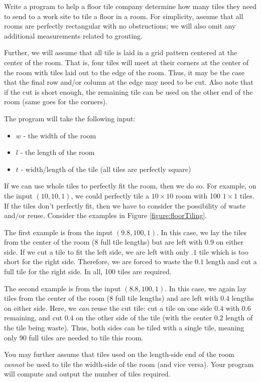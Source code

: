 \begin{exer}
Write a program to  help a floor tile company determine how many
tiles they need to send to a work site to tile a floor in a room.  For 
simplicity, assume that all rooms are perfectly rectangular with no 
obstructions; we will also omit any additional measurements related 
to grouting.  

Further, we will assume that all tile is laid in a grid pattern centered 
at the center of the room.  That is, four tiles will meet at their corners 
at the center of the room with tiles laid out to the edge of the room.  
Thus, it may be the case that the final row and/or column at the edge 
may need to be cut.  Also note that if the cut is short enough, the 
remaining tile can be used on the other end of the room (same goes 
for the corners).

The program will take the following input:
\begin{itemize}
  \item $w$ - the width of the room
  \item $l$ - the length of the room
  \item $t$ - width/length of the tile (all tiles are perfectly square)
\end{itemize}

If we can use whole tiles to perfectly fit the room, then we do so.  
For example, on the input $(10, 10, 1)$, we could perfectly tile a 
$10 \times 10$ room with 100 $1 \times 1$ tiles.  If the tiles don't 
perfectly fit, then we have to consider the possibility of waste 
and/or reuse.  Consider the examples in Figure \ref{figure:floorTiling}.



The first example is from the input $(9.8, 100, 1)$.  In this case, 
we lay the tiles from the center of the room (8 full tile lengths) but 
are left with $0.9$ on either side.  If we cut a tile to fit the left
side, we are left with only $.1$ tile which is too short for the right 
side.  Therefore, we are forced to waste the $0.1$ length and cut 
a full tile for the right side.  In all, 100 tiles are required.

The second example is from the input $(8.8, 100, 1)$.  In this case, 
we again lay tiles from the center of the room (8 full tile lengths) and 
are left with $0.4$ lengths on either side.  Here, we \emph{can}
reuse the cut tile: cut a tile on one side $0.4$ with $0.6$ remaining, 
and cut $0.4$ on the other side of the tile (with the center $0.2$ 
length of the tile being waste).  Thus, both sides can be tiled with 
a single tile, meaning only 90 full tiles are needed to tile this room.

You may further assume that tiles used on 
the length-side end of the room \emph{cannot} be used to tile the 
width-side of the room (and vice versa).  Your program will compute 
and output the number of tiles required.
\end{exer}


